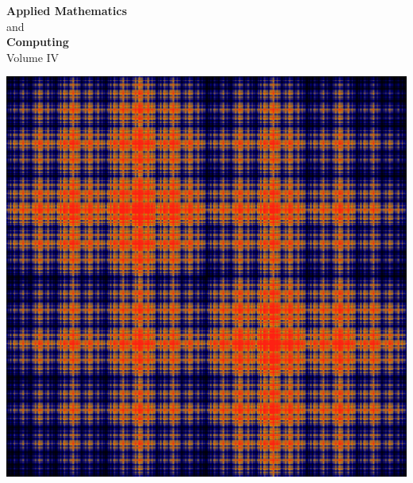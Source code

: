 \documentclass[nociteref]{newsiambook}
\begin{document}
\thispagestyle{empty}
\begin{center}
{\huge \bf Applied Mathematics} \\ and \\ {\huge \bf Computing} \\
\vspace{5mm}
{\Large Volume IV}
\vspace{20mm}

\includegraphics[scale = .25]{Cover}
\end{center}
\frontmatter



\end{document}
